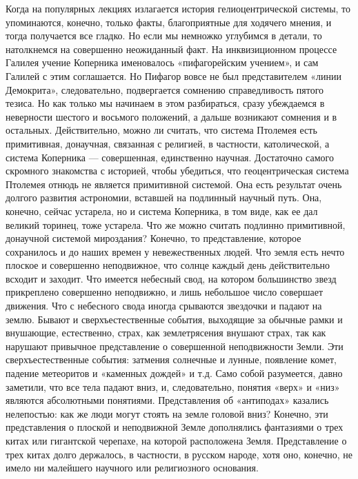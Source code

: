 Когда  на  популярных  лекциях  излагается  история  гелиоцентрической
системы,  то упоминаются,  конечно,  только  факты, благоприятные  для
ходячего мнения,  и тогда получается  все гладко. Но если  мы немножко
углубимся  в детали,  то натолкнемся  на совершенно  неожиданный факт.
На  инквизиционном  процессе   Галилея  учение  Коперника  именовалось
«пифагорейским  учением»,  и  сам   Галилей  с  этим  соглашается.  Но
Пифагор вовсе не был  представителем «линии Демокрита», следовательно,
подвергается  сомнению справедливость  пятого  тезиса.  Но как  только
мы  начинаем  в  этом   разбираться,  сразу  убеждаемся  в  неверности
шестого  и  восьмого  положений,  а  дальше  возникают  сомнения  и  в
остальных.  Действительно,  можно  ли считать,  что  система  Птолемея
есть  примитивная,  донаучная,  связанная  с  религией,  в  частности,
католической,  а   система  Коперника  ---   совершенная,  единственно
научная.  Достаточно самого  скромного  знакомства  с историей,  чтобы
убедиться,  что геоцентрическая  система Птолемея  отнюдь не  является
примитивной  системой.  Она  есть  результат  очень  долгого  развития
астрономии, вставшей  на подлинный научный путь.  Она, конечно, сейчас
устарела,  но и  система Коперника,  в том  виде, как  ее дал  великий
торинец,  тоже устарела.  Что же  можно считать  подлинно примитивной,
донаучной  системой  мироздания?  Конечно, то  представление,  которое
сохранилось и до  наших времен у невежественных людей.  Что земля есть
нечто  плоское  и  совершенно  неподвижное,  что  солнце  каждый  день
действительно всходит и заходит. Что имеется небесный свод, на котором
большинство звезд прикреплено совершенно  неподвижно, и лишь небольшое
число  совершает  движения. Что  с  небесного  свода иногда  срываются
звездочки  и падают  на  землю. Бывают  и сверхъестественные  события,
выходящие  за  обычные  рамки  и внушающие,  естественно,  страх,  как
землетрясения внушают страх, так  как нарушают привычное представление
о  совершенной неподвижности  Земли.  Эти сверхъестественные  события:
затмения  солнечные и  лунные, появление  комет, падение  метеоритов и
«каменных дождей»  и т.д. Само  собой разумеется, давно  заметили, что
все  тела  падают  вниз,  и, следовательно,  понятия  «верх»  и  «низ»
являются абсолютными понятиями.  Представления об «антиподах» казались
нелепостью: как же  люди могут стоять на земле  головой вниз? Конечно,
эти представления о плоской и неподвижной Земле дополнялись фантазиями
о трех  китах или гигантской  черепахе, на которой  расположена Земля.
Представление о  трех китах  долго держалось,  в частности,  в русском
народе,  хотя  оно,  конечно,  не  имело  ни  малейшего  научного  или
религиозного основания.

